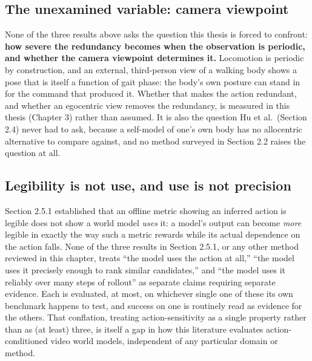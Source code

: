 \documentclass[12pt,a4paper,oneside]{report}
\begin{document}
\subsection{The unexamined variable: camera viewpoint}
None of the three results above asks the question this thesis is forced to confront: \textbf{how
severe the redundancy becomes when the observation is periodic, and whether the camera viewpoint
determines it.} Locomotion is periodic by construction, and an external, third-person view of a
walking body shows a pose that is itself a function of gait phase: the body's own posture can stand
in for the command that produced it. Whether that makes the action redundant, and whether an
egocentric view removes the redundancy, is measured in this thesis (Chapter 3) rather than assumed.
It is also the question Hu et al.\ (Section 2.4) never had to ask, because a self-model of one's own
body has no allocentric alternative to compare against, and no method surveyed in Section 2.2 raises
the question at all.

\subsection{Legibility is not use, and use is not precision}
Section 2.5.1 established that an offline metric showing an inferred action is legible does not show a
world model \emph{uses} it: a model's output can become \emph{more} legible in exactly the way such a
metric rewards while its actual dependence on the action falls. None of the three results in Section
2.5.1, or any other method reviewed in this chapter, treats ``the model uses the action at all,''
``the model uses it precisely enough to rank similar candidates,'' and ``the model uses it reliably
over many steps of rollout'' as separate claims requiring separate evidence. Each is evaluated, at
most, on whichever single one of these its own benchmark happens to test, and success on one is
routinely read as evidence for the others. That conflation, treating action-sensitivity as a single
property rather than as (at least) three, is itself a gap in how this literature evaluates
action-conditioned video world models, independent of any particular domain or method.

\end{document}
